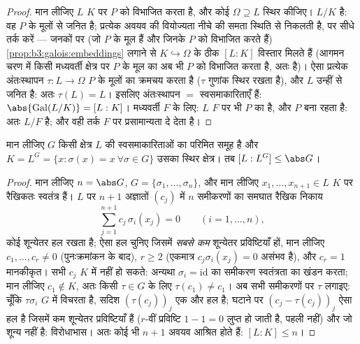 \begin{proof}
मान लीजिए $L$ $K$ पर  $P$ को विभाजित करता है, और
कोई  $\Omega \supseteq L$ स्थिर कीजिए। $L/K$  है: वह $P$
के मूलों से जनित है; प्रत्येक अवयव की वियोज्यता नीचे की समता
स्थिति से निकलती है, पर सीधे तर्क करें --- जनकों पर (जो 
$P$ के मूल हैं और जिनके  $P$ को विभाजित करते
हैं) \cref{prop:b3:galois:embeddings} लगाने से $K \hookrightarrow \Omega$ के ठीक $[L:K]$ विस्तार मिलते हैं (आगमन
चरण में किसी मध्यवर्ती क्षेत्र पर $P$ के मूल का 
अब भी $P$ को विभाजित करता है, अतः  है)। ऐसा प्रत्येक
अंतःस्थापन $\tau \colon L \to \Omega$ $P$ के मूलों का क्रमचय करता है ($\tau$ गुणांक
स्थिर रखता है), और $L$ उन्हीं से जनित है: अतः $\tau(L) = L$। इसलिए
अंतःस्थापन $=$ स्वसमाकारिताएँ हैं: $\abs{\operatorname{Gal}(L/K)} = [L:K]$। मध्यवर्ती $F$ के
लिए: $L$ $F$ पर भी $P$ का  है, और $P$
 बना रहता है: अतः $L/F$  है; और वही तर्क $F$ पर
प्रसामान्यता दे देता है।
\end{proof}

\begin{lemma}[आर्टिन]\label{lem:b3:galois:artin}
मान लीजिए $G$ किसी क्षेत्र $L$ की स्वसमाकारिताओं का परिमित
समूह है और $K = L^G = \{x : \sigma(x) = x\ \forall\sigma \in G\}$ उसका स्थिर क्षेत्र। तब $[L : L^G] \leq \abs G$।
\end{lemma}

\begin{proof}
मान लीजिए $n = \abs G$, $G = \{\sigma_1, \dots, \sigma_n\}$, और मान लीजिए $x_1, \dots, x_{n+1} \in L$ $K$ पर रैखिकतः
स्वतंत्र हैं। $L$ पर $n+1$ अज्ञातों $(c_j)$ में $n$ समीकरणों
का समघात रैखिक निकाय
\[
\sum_{j=1}^{n+1} c_j\,\sigma_i(x_j) = 0
\qquad (i = 1, \dots, n),
\]
कोई शून्येतर हल रखता है; ऐसा हल चुनिए जिसमें \emph{सबसे कम}
शून्येतर प्रविष्टियाँ हों, मान लीजिए $c_1, \dots, c_r \neq 0$ (पुनःक्रमांकन के
बाद), $r \geq 2$ (एकमात्र $c_j\sigma_i(x_j) = 0$ असंभव है), और $c_r = 1$ मानकीकृत। सभी
$c_j$ $K$ में नहीं हो सकते: अन्यथा $\sigma_i =
\mathrm{id}$ का समीकरण स्वतंत्रता
का खंडन करता; मान लीजिए $c_1 \notin K$, अतः किसी $\tau \in G$ के लिए $\tau(c_1) \ne c_1$। अब
सभी समीकरणों पर $\tau$ लगाइए: चूँकि $\tau\sigma_i$ $G$ में विचरता है,
सदिश $(\tau(c_j))_j$ एक और हल है; घटाने पर $(c_j -
\tau(c_j))_j$ ऐसा हल है जिसमें कम
शून्येतर प्रविष्टियाँ हैं ($r$-वीं प्रविष्टि $1 - 1 = 0$ लुप्त हो
जाती है, पहली नहीं) और जो शून्य नहीं है: विरोधाभास। अतः कोई भी
$n+1$ अवयव आश्रित होते हैं: $[L:K]
\leq n$।
\end{proof}

